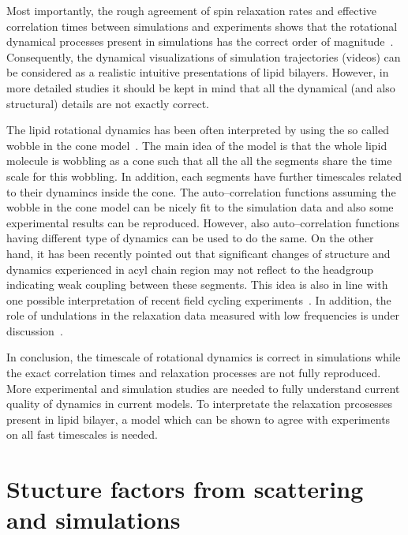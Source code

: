 \documentclass[aps,prl,superscriptaddress,twocolumn]{revtex4}
\begin{document}
Most importantly, the rough agreement of spin relaxation rates and effective correlation times between 
simulations and experiments shows that the rotational dynamical processes present in simulations has the 
correct order of magnitude~\cite{pastor88,lindahl01,pastor02,klauda08a,klauda08b,wohlert06,feller02,eldho03,ollila07a,klauda08b,klauda12,ferreira15}. 
Consequently, the dynamical visualizations of simulation trajectories 
(videos) can be considered as a realistic intuitive presentations of lipid bilayers. However,
in more detailed studies it should be kept in mind that all the dynamical (and also structural) details
are not exactly correct. 

The lipid rotational dynamics has been often interpreted by using the so called wobble in the cone model~\cite{pastor88,pastor02,klauda08a,klauda08c,sivanandam09}.
The main idea of the model is that the whole lipid molecule is wobbling as a cone such that all the
all the segments share the time scale for this wobbling. In addition, each segments have further timescales
related to their dynamincs inside the cone. The auto--correlation functions assuming the wobble in the cone
model can be nicely fit to the simulation data and also some experimental results can be reproduced. 
However, also auto--correlation functions having different type of dynamics can be used to do the same.
On the other hand, it has been recently pointed out that significant changes of structure and dynamics 
experienced in acyl chain region may not reflect to the headgroup~\cite{ferreiraTHESIS,botan15} indicating weak coupling 
between these segments. This idea is also in line with one possible interpretation of recent field cycling experiments~\cite{roberts09}.
In addition, the role of undulations in the relaxation data measured with low frequencies is under discussion~\cite{leftin11,edholm08,klauda08a,klauda08c}.

In conclusion, the timescale of rotational dynamics is correct in simulations while the exact correlation times
and relaxation processes are not fully reproduced. More experimental and simulation studies are needed 
to fully understand current quality of dynamics in current models. To interpretate the relaxation prcosesses
present in lipid bilayer, a model which can be shown to agree with experiments on all fast timescales is needed.






\section{Stucture factors from scattering and simulations}
\end{document}
